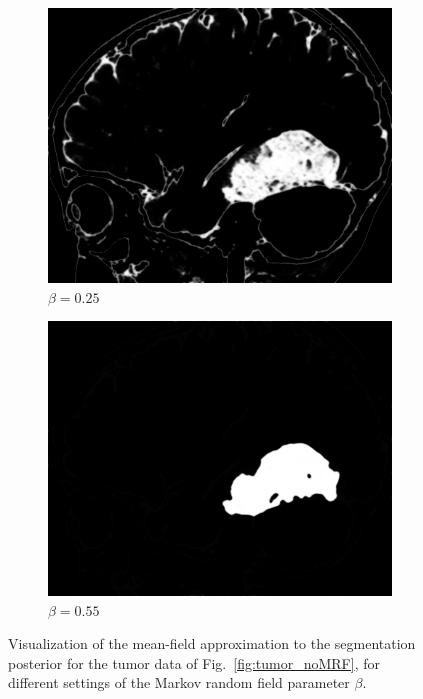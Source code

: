 \documentclass[10pt,twoside]{book}
\begin{document}
\begin{figure}
  \centering
  \begin{subfigure}{0.48\textwidth}
    \centering
    \includegraphics[width=\textwidth]{brainTumorSegmentation_withMRF_betaIsZeroDotTwentyFive}
    \caption{$\beta = 0.25$}
    \label{fig:tumor_MRF_segLowBeta}
  \end{subfigure}
  \begin{subfigure}{0.48\textwidth}
    \centering
    \includegraphics[width=\textwidth]{brainTumorSegmentation_withMRF_betaIsZeroDotFiftyFive}
    \caption{$\beta = 0.55$}
    \label{fig:tumor_MRF_segHighBeta}
  \end{subfigure}
  \caption{Visualization of the mean-field approximation to the segmentation posterior for the tumor data of Fig.~\ref{fig:tumor_noMRF}, for different settings of the Markov random field parameter $\beta$.}
  \label{fig:tumor_MRF}
\end{figure}
\end{document}
